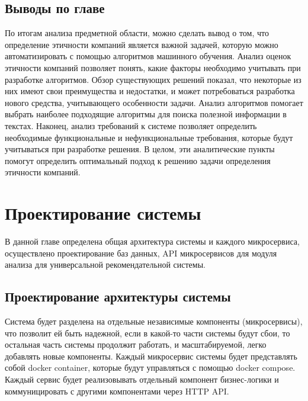 \documentclass[PI, VKR]{HSEUniversity}
\begin{document}
\section{Выводы по главе}
\label{sec:orgaf940b8}
По итогам анализа предметной области, можно сделать вывод о том, что определение этичности компаний является важной задачей, которую можно автоматизировать с помощью алгоритмов машинного обучения. Анализ оценок этичности компаний позволяет понять, какие факторы необходимо учитывать при разработке алгоритмов. Обзор существующих решений показал, что некоторые из них имеют свои преимущества и недостатки, и может потребоваться разработка нового средства, учитывающего особенности задачи. Анализ алгоритмов помогает выбрать наиболее подходящие алгоритмы для поиска полезной информации в текстах. Наконец, анализ требований к системе позволяет определить необходимые функциональные и нефункциональные требования, которые будут учитываться при разработке решения. В целом, эти аналитические пункты помогут определить оптимальный подход к решению задачи определения этичности компаний.
\chapter{Проектирование системы}
\label{sec:orgef4acd3}
В данной главе определена общая архитектура системы и каждого микросервиса, осуществлено проектирование баз данных, API микросервисов для модуля анализа для универсальной рекомендательной системы.
\section{Проектирование архитектуры системы}
\label{sec:org1fa61f9}
Система будет разделена на отдельные независимые компоненты (микросервисы), что позволит ей быть надежной, если в какой-то части системы будут сбои, то остальная часть системы продолжит работать, и масштабируемой, легко добавлять новые компоненты. Каждый микросервис системы будет представлять собой docker container, которые будут управляться с помощью docker compose. Каждый сервис будет реализовывать отдельный компонент бизнес-логики и коммуницировать с другими компонентами через HTTP API.
\end{document}
